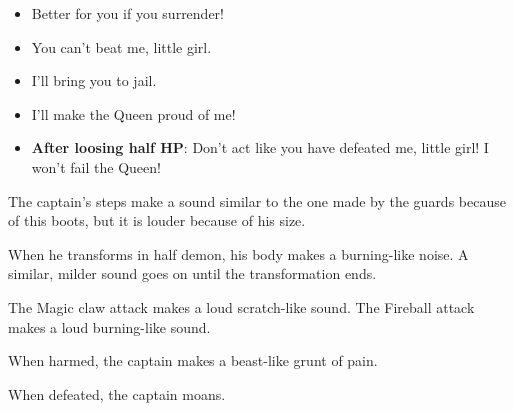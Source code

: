 \begin{itemize}
	\item Better for you if you surrender!
	\item You can't beat me, little girl.
	\item I'll bring you to jail.
	\item I'll make the Queen proud of me!
	\item \textbf{After loosing half HP}: Don't act like you have defeated me, little girl! I won't fail the Queen!
\end{itemize}

The captain's steps make a sound similar to the one made by the guards because of this boots, but it is louder because of his size.

When he transforms in half demon, his body makes a burning-like noise. A similar, milder sound goes on until the transformation ends.

The Magic claw attack makes a loud scratch-like sound. The Fireball attack makes a loud burning-like sound.

When harmed, the captain makes a beast-like grunt of pain.

When defeated, the captain moans.
